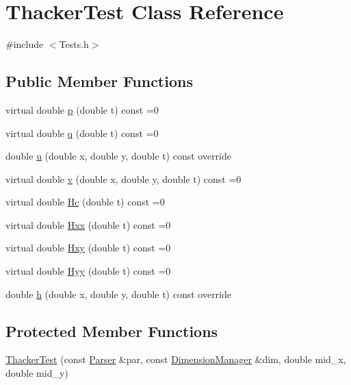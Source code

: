 \hypertarget{classThackerTest}{}\section{Thacker\+Test Class Reference}
\label{classThackerTest}


{\ttfamily \#include $<$Tests.\+h$>$}

\subsection*{Public Member Functions}
\begin{DoxyCompactItemize}
\item 
virtual double \hyperlink{classThackerTest_a9174c2c16088c48c1ece4356289e4a6c}{p} (double t) const =0
\item 
virtual double \hyperlink{classThackerTest_a622e4cd3846a7e6ea906111b6be6a0b7}{q} (double t) const =0
\item 
double \hyperlink{classThackerTest_af791cec82c7e01a575b0aa1fdb03170e}{u} (double x, double y, double t) const override
\item 
virtual double \hyperlink{classThackerTest_a445339d59012efde1e6d27ab060b6781}{v} (double x, double y, double t) const =0
\item 
virtual double \hyperlink{classThackerTest_a9a8565b3a9e9bf1e56407d2844bd8517}{Hc} (double t) const =0
\item 
virtual double \hyperlink{classThackerTest_a137a136dd1261b4a97a63831841d611b}{Hxx} (double t) const =0
\item 
virtual double \hyperlink{classThackerTest_a309f6008f53c7084163ce52cd381efc7}{Hxy} (double t) const =0
\item 
virtual double \hyperlink{classThackerTest_a4cdc886e1127e7f160cae4ed8e49f2d7}{Hyy} (double t) const =0
\item 
double \hyperlink{classThackerTest_a55163711b089d6577452f24add0bb291}{h} (double x, double y, double t) const override
\end{DoxyCompactItemize}
\subsection*{Protected Member Functions}
\begin{DoxyCompactItemize}
\item 
\hyperlink{classThackerTest_a50e9631451a42143fe78def6ed4d1018}{Thacker\+Test} (const \hyperlink{structParser}{Parser} \&par, const \hyperlink{structDimensionManager}{Dimension\+Manager} \&dim, double mid\+\_\+x, double mid\+\_\+y)
\end{DoxyCompactItemize}

